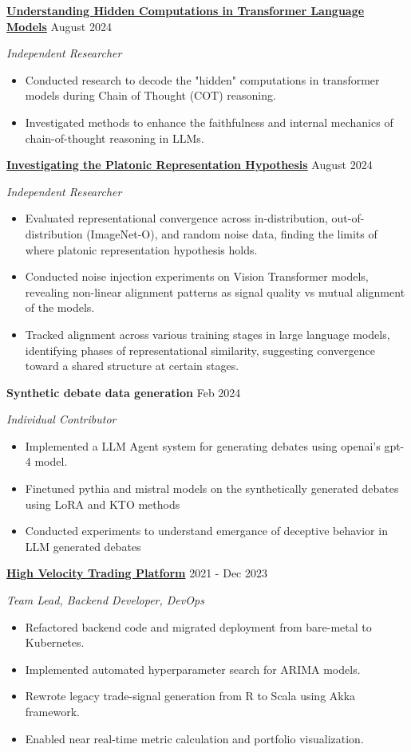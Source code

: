 \documentclass[fontsize=11pt]{article}
\newcommand{\sepspace}{\vspace*{1em}}
\newcommand{\ProjectEntry}[4]{
    \noindent \textbf{#1} \hfill {#2} \par
    \noindent \textit{#3} \par
    \noindent \small #4
    \normalsize \par}
\begin{document}
\sepspace

\ProjectEntry{\href{https://github.com/rokosbasilisk/filler_tokens}{Understanding Hidden Computations in Transformer Language Models}}{August 2024}{Independent Researcher}
{%
\begin{itemize}
\item Conducted research to decode the "hidden" computations in transformer models during Chain of Thought (COT) reasoning.
\item Investigated methods to enhance the faithfulness and internal mechanics of chain-of-thought reasoning in LLMs.
\end{itemize}}

\sepspace
\ProjectEntry{\href{https://github.com/rokosbasilisk/platonic-rep}{Investigating the Platonic Representation Hypothesis}}{August 2024}{Independent Researcher}
{%
\begin{itemize}
\item Evaluated representational convergence across in-distribution, out-of-distribution (ImageNet-O), and random noise data, finding the limits of where platonic representation hypothesis holds.
\item Conducted noise injection experiments on Vision Transformer models, revealing non-linear alignment patterns as signal quality vs mutual alignment of the models.
\item Tracked alignment across various training stages in large language models, identifying phases of representational similarity, suggesting convergence toward a shared structure at certain stages.
\end{itemize}}

\sepspace
\ProjectEntry{Synthetic debate data generation}{Feb 2024}{Individual Contributor}
{%
\begin{itemize}
\item Implemented a LLM Agent system for generating debates using openai's gpt-4 model.
\item Finetuned pythia and mistral models on the synthetically generated debates using LoRA and KTO methods
\item Conducted experiments to understand emergance of deceptive behavior in LLM generated debates 
\end{itemize}}

\sepspace
\sepspace
\ProjectEntry{\href{https://tplusone.org}{High Velocity Trading Platform}}{2021 - Dec 2023}{Team Lead, Backend Developer, DevOps}
{%
\begin{itemize}
\item Refactored backend code and migrated deployment from bare-metal to Kubernetes.
\item Implemented automated hyperparameter search for ARIMA models.
\item Rewrote legacy trade-signal generation from R to Scala using Akka framework.
\item Enabled near real-time metric calculation and portfolio visualization.
\end{itemize}}
\end{document}
